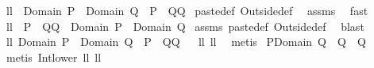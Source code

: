 \begin{isabellebody}
%
\endisadelimproof
\isanewline
\isanewline
{}\isamarkupfalse%
\ ll{}{}{\isacharcolon}\ \ {\isachardoublequoteopen}{\isacharparenleft}Domain\ P\ {\isasymsubseteq}\ Domain\ Q{\isacharparenright}{\isachardoublequoteclose}\ \ {\isachardoublequoteopen}{\isacharparenleft}P\ {\isacharplus}{\isacharasterisk}\ Q{\isacharequal}Q{\isacharparenright}{\isachardoublequoteclose}\isanewline
%
\isadelimproof
%
\endisadelimproof
%
\isatagproof
{}\isamarkupfalse%
\ paste{\isacharunderscore}def\ Outside{\isacharunderscore}def\ \isamarkupfalse%
\ assms\ \isamarkupfalse%
\ fast%
\endisatagproof
{\isafoldproof}%
%
\isadelimproof
\isanewline
%
\endisadelimproof
\isanewline
{}\isamarkupfalse%
\ ll{}{}{\isacharcolon}\ \ {\isachardoublequoteopen}{\isacharparenleft}P\ {\isacharplus}{\isacharasterisk}\ Q{\isacharequal}Q{\isacharparenright}{\isachardoublequoteclose}\ \ {\isachardoublequoteopen}{\isacharparenleft}Domain\ P\ {\isasymsubseteq}\ Domain\ Q{\isacharparenright}{\isachardoublequoteclose}\isanewline
%
\isadelimproof
%
\endisadelimproof
%
\isatagproof
{}\isamarkupfalse%
\ assms\ paste{\isacharunderscore}def\ Outside{\isacharunderscore}def\ \isamarkupfalse%
\ blast%
\endisatagproof
{\isafoldproof}%
%
\isadelimproof
\isanewline
%
\endisadelimproof
\isanewline
{}\isamarkupfalse%
\ ll{}{}{\isacharcolon}\ {\isachardoublequoteopen}{\isacharparenleft}Domain\ P\ {\isasymsubseteq}\ Domain\ Q{\isacharparenright}\ {\isacharequal}\ {\isacharparenleft}P\ {\isacharplus}{\isacharasterisk}\ Q{\isacharequal}Q{\isacharparenright}{\isachardoublequoteclose}%
\isadelimproof
\ %
\endisadelimproof
%
\isatagproof
{}\isamarkupfalse%
\ ll{}{}\ ll{}{}\ \isamarkupfalse%
\ metis%
\endisatagproof
{\isafoldproof}%
%
\isadelimproof
%
\endisadelimproof
\isanewline
\isanewline
{}\isamarkupfalse%
\ {\isachardoublequoteopen}{\isacharparenleft}P{\isacharbar}{\isacharbar}{\isacharparenleft}Domain\ Q{\isacharparenright}{\isacharparenright}\ {\isacharplus}{\isacharasterisk}\ Q\ {\isacharequal}\ Q{\isachardoublequoteclose}%
\isadelimproof
\ %
\endisadelimproof
%
\isatagproof
{}\isamarkupfalse%
\ {\isacharparenleft}metis\ Int{\isacharunderscore}lower{}\ ll{}{}\ ll{}{}{\isacharparenright}%

\end{isabellebody}
